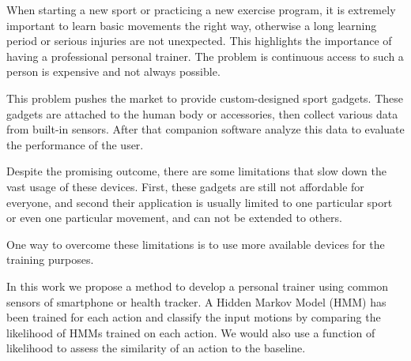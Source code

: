 When starting a new sport or practicing a new exercise program, it is extremely important to learn basic movements the right way, otherwise a long learning period or serious injuries are not unexpected. This highlights the importance of having a professional personal trainer. The problem is continuous access to such a person is expensive and not always possible.

This problem pushes the market to provide custom-designed sport gadgets. These gadgets are attached to the human body or accessories, then collect various data from built-in sensors. After that companion software analyze this data to evaluate the performance of the user.

Despite the promising outcome, there are some limitations that slow down the vast usage of these devices. First, these gadgets are still not affordable for everyone, and second their application is usually limited to one particular sport or even one particular movement, and can not be extended to others.

One way to overcome these limitations is to use more available devices for the training purposes.

In this work we propose a method to develop a personal trainer using common sensors of smartphone or health tracker. A Hidden Markov Model (HMM) has been trained for each action and classify the input motions by comparing the likelihood of HMMs trained on each action. We would also use a function of likelihood to assess the similarity of an action to the baseline. 